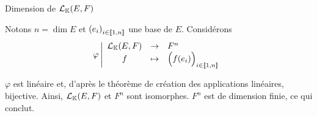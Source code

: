 \documentclass{article}
\renewenvironment{question_kholle}[2][ ]
{
	\subsection{\texorpdfstring{#2}{}}
	\notblank{#1}
	{
		\noindent #1
		\bigbreak
	}
	{}
	\begin{proof}
}
{
	\end{proof}
}
\begin{document}
\begin{question_kholle}
  [$\mathcal{L}_\K(E,F)$ est dimension finie et
    \begin{equation}
      \dim \mathcal{L}_\K(E,F) = \dim E \times \dim F
    \end{equation}]
  {Dimension de $\mathcal{L}_\K(E,F)$}

  Notons $n = \dim E$ et $\left(e_i\right)_{i \in [\![ 1 , n ]\!]}$ une base de $E$. Considérons
  \begin{equation*}
    \varphi
    \left| \begin{array}{ccl}
      \mathcal{L}_{\mathbb K}(E,F) & \to     & F^n                                            \\
      f                   & \mapsto & \Big( f(e_i) \Big)_{i \in [\![ 1 , n ]\!]}
    \end{array} \right.
  \end{equation*}

  $\varphi$ est linéaire et, d'après le théorème de création des applications linéaires, bijective.
  Ainsi, $\mathcal{L}_\K(E,F)$ et $F^n$ sont isomorphes. $F^n$ est de dimension finie, ce qui conclut.
\end{question_kholle}
\end{document}
